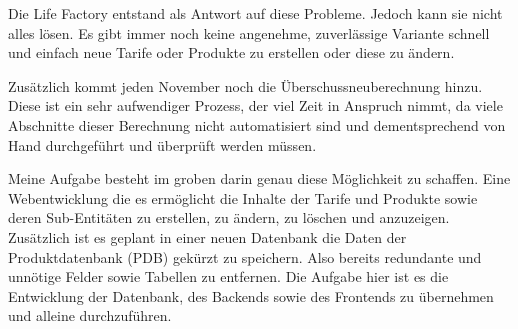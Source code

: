 Die Life Factory entstand als Antwort auf diese Probleme. Jedoch kann sie nicht alles lösen.
Es gibt immer noch keine angenehme, zuverlässige Variante schnell und einfach neue Tarife oder Produkte zu erstellen oder diese zu ändern.

Zusätzlich kommt jeden November noch die Überschussneuberechnung hinzu. Diese ist ein sehr aufwendiger Prozess, der viel Zeit in Anspruch nimmt,
da viele Abschnitte dieser Berechnung nicht automatisiert sind und dementsprechend von Hand durchgeführt und überprüft werden müssen.

Meine Aufgabe besteht im groben darin genau diese Möglichkeit zu schaffen. Eine Webentwicklung die es ermöglicht die Inhalte der Tarife und Produkte sowie deren Sub-Entitäten
zu erstellen, zu ändern, zu löschen und anzuzeigen. Zusätzlich ist es geplant in einer neuen Datenbank die Daten der Produktdatenbank (PDB) gekürzt zu speichern.
Also bereits redundante und unnötige Felder sowie Tabellen zu entfernen. Die Aufgabe hier ist es die Entwicklung der Datenbank, des Backends sowie des Frontends zu übernehmen und alleine durchzuführen.
